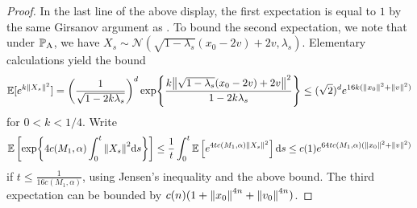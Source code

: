 \documentclass{article}
\theoremstyle{plain}
\theoremstyle{definition}
\theoremstyle{remark}
\begin{document}
\begin{proof}
	In the last line of the above display, the first expectation is equal to $1$ by the same Girsanov argument as \citet[Example 3, Section 6.2.3]{liptser1977book}. To bound the second expectation, we note that under $\P_{\operatorname{A}}$, we have $X_s \sim \mathcal N(\sqrt{1-\lambda_s} (x_0-2v)+2v, \lambda_s)$. Elementary calculations yield the bound
	\begin{equation*}
		\E[e^{k\norm{X_s}^2}] = \pr{\frac{1}{\sqrt{1-2k\lambda_s}}}^d \exp{\frac{k\norm{
					\sqrt{1-\lambda_s}(x_0-2v) + 2v
				}^2}{1-2k\lambda_s}} \leq (\sqrt 2)^d e^{16k(\norm{x_0}^2 + \norm{v}^2)}
	\end{equation*}
	for $0<k<1/4$. Write
	\begin{equation*}
		\begin{split}
			\E\ps{\exp{4c(M_1, \alpha) \inormx}} \leq \frac 1t \int_0^t \E\ps{e^{4tc(M_1, \alpha) \norm{X_s}^2}} \dd s \leq c(1) e^{64tc(M_1, \alpha) (\norm{x_0}^2 + \norm{v}^2)}
		\end{split}
	\end{equation*}
	if $t \leq \frac{1}{16c(M_1, \alpha)}$, using Jensen's inequality and the above bound. The third expectation can be bounded by $c(n)(1 + \norm{x_0}^{4n} + \norm{v_0}^{4n})$.


\end{proof}
\end{document}
